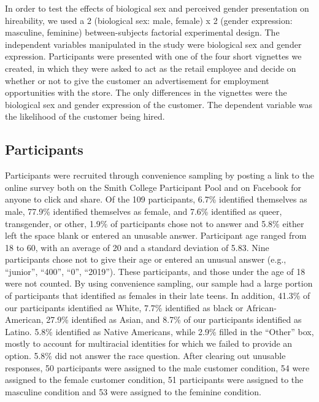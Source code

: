 \documentclass[english,man]{apa6}
\theoremstyle{definition}
\theoremstyle{definition}
\theoremstyle{remark}
\begin{document}
In order to test the effects of biological sex and perceived gender
presentation on hireability, we used a 2 (biological sex: male, female)
x 2 (gender expression: masculine, feminine) between-subjects factorial
experimental design. The independent variables manipulated in the study
were biological sex and gender expression. Participants were presented
with one of the four short vignettes we created, in which they were
asked to act as the retail employee and decide on whether or not to give
the customer an advertisement for employment opportunities with the
store. The only differences in the vignettes were the biological sex and
gender expression of the customer. The dependent variable was the
likelihood of the customer being hired.

\subsection{Participants}\label{participants}

Participants were recruited through convenience sampling by posting a
link to the online survey both on the Smith College Participant Pool and
on Facebook for anyone to click and share. Of the 109 participants,
6.7\% identified themselves as male, 77.9\% identified themselves as
female, and 7.6\% identified as queer, transgender, or other, 1.9\% of
participants chose not to answer and 5.8\% either left the space blank
or entered an unusable answer. Participant age ranged from 18 to 60,
with an average of 20 and a standard deviation of 5.83. Nine
participants chose not to give their age or entered an unusual answer
(e.g., \enquote{junior}, \enquote{400}, \enquote{0}, \enquote{2019}).
These participants, and those under the age of 18 were not counted. By
using convenience sampling, our sample had a large portion of
participants that identified as females in their late teens. In
addition, 41.3\% of our participants identified as White, 7.7\%
identified as black or African-American, 27.9\% identified as Asian, and
8.7\% of our participants identified as Latino. 5.8\% identified as
Native Americans, while 2.9\% filled in the \enquote{Other} box, mostly
to account for multiracial identities for which we failed to provide an
option. 5.8\% did not answer the race question. After clearing out
unusable responses, 50 participants were assigned to the male customer
condition, 54 were assigned to the female customer condition, 51
participants were assigned to the masculine condition and 53 were
assigned to the feminine condition.
\end{document}

